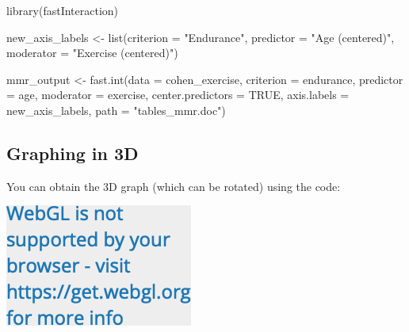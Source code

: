 \documentclass[
]{krantz}
\makeatletter
\newenvironment{Shaded}{\begin{snugshade}}{\end{snugshade}}
\newcommand{\AttributeTok}[1]{\textcolor[rgb]{0.61,0.61,0.61}{#1}}
\newcommand{\ConstantTok}[1]{\textcolor[rgb]{0,0,0}{#1}}
\newcommand{\FunctionTok}[1]{\textcolor[rgb]{0,0,0}{#1}}
\newcommand{\NormalTok}[1]{#1}
\newcommand{\OtherTok}[1]{\textcolor[rgb]{0.37,0.37,0.37}{#1}}
\newcommand{\SpecialCharTok}[1]{\textcolor[rgb]{0,0,0}{#1}}
\newcommand{\StringTok}[1]{\textcolor[rgb]{0.5,0.5,0.5}{#1}}
\newenvironment{kframe}{%
\medskip{}
\setlength{\fboxsep}{.8em}
 \def\at@end@of@kframe{}%
 \ifinner\ifhmode%
  \def\at@end@of@kframe{\end{minipage}}%
  \begin{minipage}{\columnwidth}%
 \fi\fi%
 \def\FrameCommand##1{\hskip\@totalleftmargin \hskip-\fboxsep
 \colorbox{shadecolor}{##1}\hskip-\fboxsep
     \hskip-\linewidth \hskip-\@totalleftmargin \hskip\columnwidth}%
 \MakeFramed {\advance\hsize-\width
   \@totalleftmargin\z@ \linewidth\hsize
   \@setminipage}}%
 {\par\unskip\endMakeFramed%
 \at@end@of@kframe}
\renewenvironment{Shaded}{\begin{kframe}}{\end{kframe}}
\makeatother
\begin{document}
\begin{Shaded}
\begin{Highlighting}[]
\FunctionTok{library}\NormalTok{(fastInteraction)}

\NormalTok{new\_axis\_labels }\OtherTok{\textless{}{-}} \FunctionTok{list}\NormalTok{(}\AttributeTok{criterion =} \StringTok{"Endurance"}\NormalTok{,}
                        \AttributeTok{predictor =} \StringTok{"Age (centered)"}\NormalTok{,}
                        \AttributeTok{moderator =} \StringTok{"Exercise (centered)"}\NormalTok{)}

\NormalTok{mmr\_output }\OtherTok{\textless{}{-}} \FunctionTok{fast.int}\NormalTok{(}\AttributeTok{data =}\NormalTok{ cohen\_exercise,}
                       \AttributeTok{criterion =}\NormalTok{ endurance,}
                       \AttributeTok{predictor =}\NormalTok{ age,}
                       \AttributeTok{moderator =}\NormalTok{ exercise,}
                       \AttributeTok{center.predictors =} \ConstantTok{TRUE}\NormalTok{,}
                       \AttributeTok{axis.labels =}\NormalTok{ new\_axis\_labels,}
                       \AttributeTok{path =} \StringTok{"tables\_mmr.doc"}\NormalTok{)}
\end{Highlighting}
\end{Shaded}

\hypertarget{graphing-in-3d}{%
\subsection{Graphing in 3D}\label{graphing-in-3d}}

You can obtain the 3D graph (which can be rotated) using the code:

\begin{Shaded}
\end{Shaded}

\includegraphics{bookdown_files/figure-latex/unnamed-chunk-488-1.png}
\end{document}
